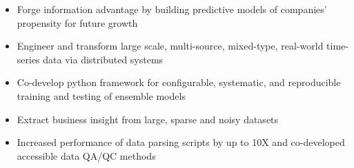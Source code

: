 \documentclass[10.95pt,letterpaper]{altacv}
\newlength{\comlogowidth}
\newcommand{\companylogo}[1]{%
	\savebox{\comlogobox}{\texttt{[image: \#1]}}%
	\settowidth{\comlogowidth}{\usebox{\comlogobox}}
}
\newcommand{\makelogospace}{\hspace*{\comlogowidth}\enspace}
\newcommand{\usecompanylogo}{\raisebox{0pt}[1em]{\usebox{\comlogobox}}\enspace}
\begin{document}
	
	\begin{fullwidth}
		\makecvheader
	\end{fullwidth}
	
	
	\begin{itemize}
		\item Forge information advantage by building predictive models of companies' propensity for future growth
		\item Engineer and transform large scale, multi-source, mixed-type, real-world time-series data via distributed systems
		\item Co-develop python framework for configurable, systematic, and reproducible training and testing of ensemble models
		\item Extract business insight from large, sparse and noisy datasets
	\end{itemize}
	\divider	
	
\begin{itemize}
	\item Increased performance of data parsing scripts by up to 10X and co-developed accessible data QA/QC methods
\end{itemize}
\divider	
	
\end{document}
